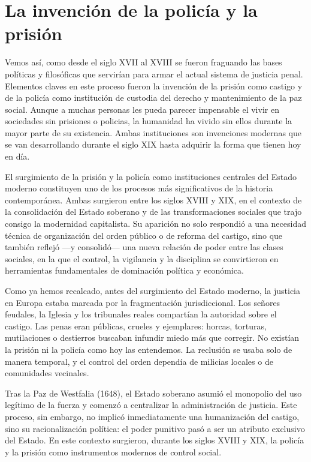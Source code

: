 \documentclass[
  spanish,
  letterpaper,
  DIV=11,
  numbers=noendperiod]{scrreprt}
\begin{document}
\section{La invención de la policía y la
prisión}\label{la-invenciuxf3n-de-la-policuxeda-y-la-prisiuxf3n}

Vemos así, como desde el siglo XVII al XVIII se fueron fraguando las
bases políticas y filosóficas que servirían para armar el actual sistema
de justicia penal. Elementos claves en este proceso fueron la invención
de la prisión como castigo y de la policía como institución de custodia
del derecho y mantenimiento de la paz social. Aunque a muchas personas
les pueda parecer impensable el vivir en sociedades sin prisiones o
policias, la humanidad ha vivido sin ellos durante la mayor parte de su
existencia. Ambas instituciones son invenciones modernas que se van
desarrollando durante el siglo XIX hasta adquirir la forma que tienen
hoy en día.

El surgimiento de la prisión y la policía como instituciones centrales
del Estado moderno constituyen uno de los procesos más significativos de
la historia contemporánea. Ambas surgieron entre los siglos XVIII y XIX,
en el contexto de la consolidación del Estado soberano y de las
transformaciones sociales que trajo consigo la modernidad capitalista.
Su aparición no solo respondió a una necesidad técnica de organización
del orden público o de reforma del castigo, sino que también reflejó
---y consolidó--- una nueva relación de poder entre las clases sociales,
en la que el control, la vigilancia y la disciplina se convirtieron en
herramientas fundamentales de dominación política y económica.

Como ya hemos recalcado, antes del surgimiento del Estado moderno, la
justicia en Europa estaba marcada por la fragmentación jurisdiccional.
Los señores feudales, la Iglesia y los tribunales reales compartían la
autoridad sobre el castigo. Las penas eran públicas, crueles y
ejemplares: horcas, torturas, mutilaciones o destierros buscaban
infundir miedo más que corregir. No existían la prisión ni la policía
como hoy las entendemos. La reclusión se usaba solo de manera temporal,
y el control del orden dependía de milicias locales o de comunidades
vecinales.

Tras la Paz de Westfalia (1648), el Estado soberano asumió el monopolio
del uso legítimo de la fuerza y comenzó a centralizar la administración
de justicia. Este proceso, sin embargo, no implicó inmediatamente una
humanización del castigo, sino su racionalización política: el poder
punitivo pasó a ser un atributo exclusivo del Estado. En este contexto
surgieron, durante los siglos XVIII y XIX, la policía y la prisión como
instrumentos modernos de control social.
\end{document}
